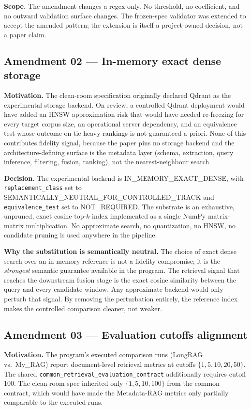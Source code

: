 \documentclass[11pt,a4paper]{article}
\begin{document}
\textbf{Scope.} The amendment changes a regex only. No threshold, no
coefficient, and no outward validation surface changes. The
frozen-spec validator was extended to accept the amended pattern;
the extension is itself a project-owned decision, not a paper claim.

\subsection{Amendment 02 --- In-memory exact dense storage}
\textbf{Motivation.} The clean-room specification originally
declared Qdrant as the experimental storage backend. On review, a
controlled Qdrant deployment would have added an HNSW approximation
risk that would have needed re-freezing for every target corpus
size, an operational server dependency, and an equivalence test
whose outcome on tie-heavy rankings is not guaranteed a priori.
None of this contributes fidelity signal, because the paper pins no
storage backend and the architecture-defining surface is the
metadata layer (schema, extraction, query inference, filtering,
fusion, ranking), not the nearest-neighbour search.

\textbf{Decision.} The experimental backend is
\textsc{IN\_MEMORY\_EXACT\_DENSE}, with
\texttt{replacement\_class} set to
\textsc{SEMANTICALLY\_NEUTRAL\_FOR\_CONTROLLED\_TRACK} and
\texttt{equivalence\_test} set to \textsc{NOT\_REQUIRED}. The
substrate is an exhaustive, unpruned, exact cosine top-$k$ index
implemented as a single NumPy matrix-matrix multiplication. No
approximate search, no quantization, no HNSW, no candidate pruning
is used anywhere in the pipeline.

\textbf{Why the substitution is semantically neutral.} The choice of
exact dense search over an in-memory reference is not a fidelity
compromise; it is the \emph{strongest} semantic guarantee available
in the program. The retrieval signal that reaches the downstream
fusion stage is the exact cosine similarity between the query and
every candidate window. Any approximate backend would only perturb
that signal. By removing the perturbation entirely, the reference
index makes the controlled comparison cleaner, not weaker.

\subsection{Amendment 03 --- Evaluation cutoffs alignment}
\textbf{Motivation.} The program's executed comparison runs
(LongRAG vs.\ My\_RAG) report document-level retrieval metrics at
cutoffs $\{1, 5, 10, 20, 50\}$. The shared
\texttt{common\_retrieval\_evaluation\_contract} additionally
requires cutoff \num{100}. The clean-room spec inherited only
$\{1, 5, 10, 100\}$ from the common contract, which would have made
the Metadata-RAG metrics only partially comparable to the executed
runs.
\end{document}
